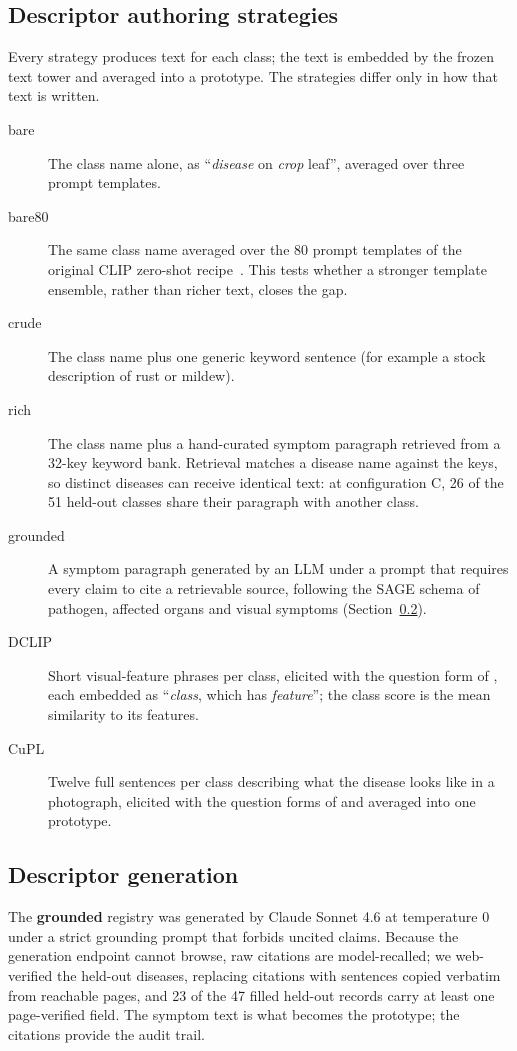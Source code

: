 \documentclass[a4paper,fleqn]{cas-dc}
\begin{document}
\subsection{Descriptor authoring strategies}
\label{sec:strategies}

Every strategy produces text for each class; the text is embedded by the frozen text tower and
averaged into a prototype. The strategies differ only in how that text is written.

\begin{description}
\item[bare] The class name alone, as ``\emph{disease} on \emph{crop} leaf'', averaged over three
prompt templates.
\item[bare80] The same class name averaged over the 80 prompt templates of the original CLIP
zero-shot recipe~\citep{radford2021}. This tests whether a stronger template ensemble, rather than
richer text, closes the gap.
\item[crude] The class name plus one generic keyword sentence (for example a stock description of
rust or mildew).
\item[rich] The class name plus a hand-curated symptom paragraph retrieved from a 32-key keyword
bank. Retrieval matches a disease name against the keys, so distinct diseases can receive identical
text: at configuration C, 26 of the 51 held-out classes share their paragraph with another class.
\item[grounded] A symptom paragraph generated by an LLM under a prompt that requires every claim to
cite a retrievable source, following the SAGE schema of pathogen, affected organs and visual
symptoms (Section~\ref{sec:desc-gen}).
\item[DCLIP] Short visual-feature phrases per class, elicited with the question form of
\citet{menon2023}, each embedded as ``\emph{class}, which has \emph{feature}''; the class score is the
mean similarity to its features.
\item[CuPL] Twelve full sentences per class describing what the disease looks like in a photograph,
elicited with the question forms of \citet{pratt2023} and averaged into one prototype.
\end{description}

\subsection{Descriptor generation}
\label{sec:desc-gen}

The \textbf{grounded} registry was generated by Claude Sonnet 4.6 at temperature 0 under a strict
grounding prompt that forbids uncited claims. Because the generation endpoint cannot browse, raw
citations are model-recalled; we web-verified the held-out diseases, replacing citations with
sentences copied verbatim from reachable pages, and 23 of the 47 filled held-out records carry at
least one page-verified field. The symptom text is what becomes the prototype; the citations provide
the audit trail.
\end{document}
